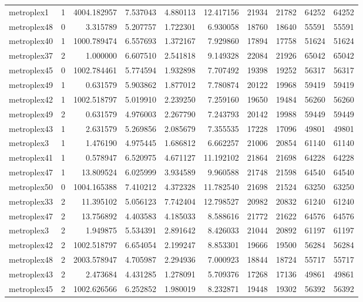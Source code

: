 \begin{longtable}{|l|r|r|r|r|r|r|r|r|r|}
metroplex1 & 1 & 4004.182957 & 7.537043 & 4.880113 & 12.417156 & 21934 & 21782 & 64252 & 64252 \\
metroplex48 & 0 & 3.315789 & 5.207757 & 1.722301 & 6.930058 & 18760 & 18640 & 55591 & 55591 \\
metroplex40 & 1 & 1000.789474 & 6.557693 & 1.372167 & 7.929860 & 17894 & 17758 & 51624 & 51624 \\
metroplex37 & 2 & 1.000000 & 6.607510 & 2.541818 & 9.149328 & 22084 & 21926 & 65042 & 65042 \\
metroplex45 & 0 & 1002.784461 & 5.774594 & 1.932898 & 7.707492 & 19398 & 19252 & 56317 & 56317 \\
metroplex49 & 1 & 0.631579 & 5.903862 & 1.877012 & 7.780874 & 20122 & 19968 & 59419 & 59419 \\
metroplex42 & 1 & 1002.518797 & 5.019910 & 2.239250 & 7.259160 & 19650 & 19484 & 56260 & 56260 \\
metroplex49 & 2 & 0.631579 & 4.976003 & 2.267790 & 7.243793 & 20142 & 19988 & 59449 & 59449 \\
metroplex43 & 1 & 2.631579 & 5.269856 & 2.085679 & 7.355535 & 17228 & 17096 & 49801 & 49801 \\
metroplex3 & 1 & 1.476190 & 4.975445 & 1.686812 & 6.662257 & 21006 & 20854 & 61140 & 61140 \\
metroplex41 & 1 & 0.578947 & 6.520975 & 4.671127 & 11.192102 & 21864 & 21698 & 64228 & 64228 \\
metroplex47 & 1 & 13.809524 & 6.025999 & 3.934589 & 9.960588 & 21748 & 21598 & 64540 & 64540 \\
metroplex50 & 0 & 1004.165388 & 7.410212 & 4.372328 & 11.782540 & 21698 & 21524 & 63250 & 63250 \\
metroplex33 & 2 & 11.395102 & 5.056123 & 7.742404 & 12.798527 & 20982 & 20832 & 61240 & 61240 \\
metroplex47 & 2 & 13.756892 & 4.403583 & 4.185033 & 8.588616 & 21772 & 21622 & 64576 & 64576 \\
metroplex3 & 2 & 1.949875 & 5.534391 & 2.891642 & 8.426033 & 21044 & 20892 & 61197 & 61197 \\
metroplex42 & 2 & 1002.518797 & 6.654054 & 2.199247 & 8.853301 & 19666 & 19500 & 56284 & 56284 \\
metroplex48 & 2 & 2003.578947 & 4.705987 & 2.294936 & 7.000923 & 18844 & 18724 & 55717 & 55717 \\
metroplex43 & 2 & 2.473684 & 4.431285 & 1.278091 & 5.709376 & 17268 & 17136 & 49861 & 49861 \\
metroplex45 & 2 & 1002.626566 & 6.252852 & 1.980019 & 8.232871 & 19448 & 19302 & 56392 & 56392 \\

\end{longtable}
